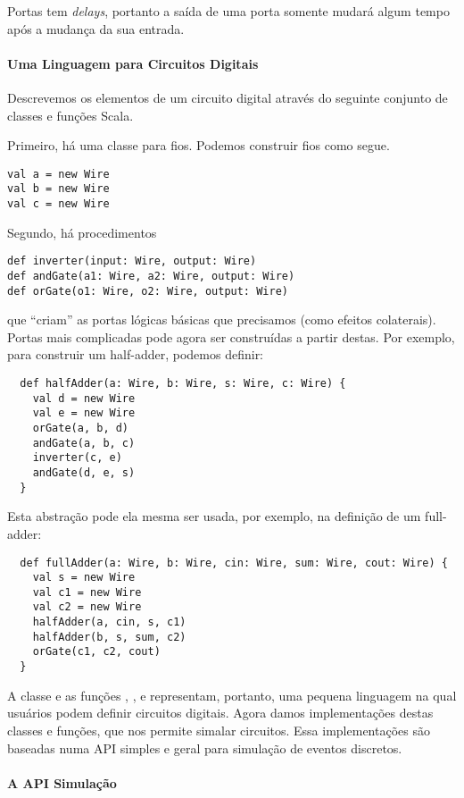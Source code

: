 Portas tem {\em delays}, portanto a saída de uma porta somente mudará
algum tempo após a mudança da sua entrada.

\paragraph{Uma Linguagem para Circuitos Digitais}

Descrevemos os elementos de um circuito digital através do seguinte conjunto de classes e funções Scala.

Primeiro, há uma classe  para fios. Podemos construir fios como segue.
\begin{lstlisting}
val a = new Wire
val b = new Wire
val c = new Wire
\end{lstlisting}
Segundo, há procedimentos
\begin{lstlisting}
def inverter(input: Wire, output: Wire)
def andGate(a1: Wire, a2: Wire, output: Wire)
def orGate(o1: Wire, o2: Wire, output: Wire)
\end{lstlisting}
que ``criam'' as portas lógicas básicas que precisamos (como efeitos
colaterais).  Portas mais complicadas pode agora ser construídas a
partir destas. Por exemplo, para construir um half-adder, podemos
definir:
\begin{lstlisting}
  def halfAdder(a: Wire, b: Wire, s: Wire, c: Wire) {
    val d = new Wire
    val e = new Wire
    orGate(a, b, d)
    andGate(a, b, c)
    inverter(c, e)
    andGate(d, e, s)
  }
\end{lstlisting}
Esta abstração pode ela mesma ser usada, por exemplo, na definição de um full-adder:
\begin{lstlisting}
  def fullAdder(a: Wire, b: Wire, cin: Wire, sum: Wire, cout: Wire) {
    val s = new Wire
    val c1 = new Wire
    val c2 = new Wire
    halfAdder(a, cin, s, c1)
    halfAdder(b, s, sum, c2)
    orGate(c1, c2, cout)
  }
\end{lstlisting}
A classe  e as funções , ,
e  representam, portanto, uma pequena linguagem na qual
usuários podem definir circuitos digitais. Agora damos implementações
destas classes e funções, que nos permite simalar circuitos. Essa
implementações são baseadas numa API simples e geral para simulação de
eventos discretos.

\paragraph{A API Simulação}


